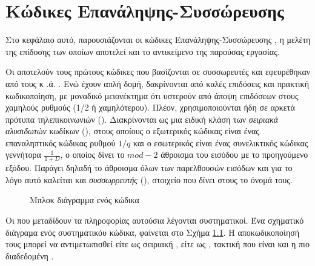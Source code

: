 \chapter{Κώδικες Επανάληψης-Συσσώρευσης }



Στο κεφάλαιο αυτό, παρουσιάζονται οι κώδικες Επανάληψης-Συσσώρευσης , η μελέτη της επίδοσης των οποίων αποτελεί και το αντικείμενο της παρούσας εργασίας.

Οι  αποτελούν τους πρώτους κώδικες που βασίζονται σε συσσωρευτές και εφευρέθηκαν από τους  κ .ά. \cite{divsalar1998coding}. Ενώ έχουν απλή δομή, δακρίνονται από καλές επιδόσεις και πρακτική κωδικοποίηση, με μοναδικό μειονέκτημα ότι υστερούν από άποψη επιδόσεων στους χαμηλούς ρυθμούς (1/2 ή χαμηλότερου). Πλέον, χρησιμοποιούνται ήδη σε αρκετά πρότυπα τηλεπικοινωνιών (). Διακρίνονται ως μια ειδική κλάση των \textit{σειριακά αλυσιδωτών} κωδίκων (), στους οποίους ο εξωτερικός κώδικας είναι ένας επαναληπτικός κώδικας ρυθμού $1/q$ και ο εσωτερικός είναι ένας συνελικτικός κώδικας γεννήτορα $\frac{1}{1+D}$, ο οποίος δίνει το $mod-2$ άθροισμα του  εισόδου με το προηγούμενο  εξόδου. Παράγει δηλαδή το άθροισμα όλων των παρελθουσών εισόδων και για το λόγο αυτό καλείται και \textit{συσσωρρευτής} (), στοιχείο που δίνει στους  το όνομά τους.

\begin{figure}[h]
\caption{Μπλοκ διάγραμμα ενός  κώδικα}
\label{fig:RA scheme graph}
\end{figure}

Οι  που μεταδίδουν τα  πληροφορίας αυτούσια λέγονται συστηματικοί. Ένα σχηματικό διάγραμα ενός συστηματικόυ  κώδικα, φαίνεται στο Σχήμα \ref{fig:RA scheme graph}. Η αποκωδικοποίησή τους μπορεί να αντιμετωπισθεί είτε ως σειριακή , είτε ως , τακτική που είναι και η πιο διαδεδομένη \cite{ryan2009channel}.


